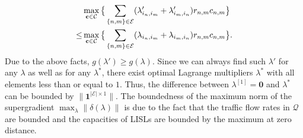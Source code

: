 \documentclass[journal]{IEEEtran}
\begin{document}
\begin{equation}
  \begin{aligned}
&\max_{
  \substack{
    \mathbf{c}\in\mathcal{C}
  }
}
\big\{
\sum_{\{n,m\}\in\mathcal{E}} (\lambda'_{i_n,i_m} + \lambda'_{i_m,i_n})  r_{n,m} c_{n,m}
\big\}\\ 
\leq&
\max_{
  \substack{
    \mathbf{c}\in\mathcal{C}
  }
}
\big\{
\sum_{\{n,m\}\in\mathcal{E}} (\lambda_{i_n,i_m} + \lambda_{i_m,i_n})  r_{n,m} c_{n,m}
\big\}.
  \end{aligned}
  \notag
\end{equation}
Due to the above facts, $g(\lambda')\geq g(\lambda)$. Since we can always find such $\lambda'$ for any $\lambda$ as well as for any $\lambda^*$, there exist optimal Lagrange multipliers $\lambda^*$ with all elements less than or equal to $1$. Thus, the difference between $\lambda^{[1]}=\mathbf{0}$ and $\lambda^*$ can be bounded by $\|\mathbf{1}^{|\mathcal{E}|\times1}\|$. The boundedness of the maximum norm of the supergradient $\max_\lambda \|\delta(\lambda)\|$ is due to the fact that the traffic flow rates in $\mathcal{Q}$ are bounded and the capacities of LISLs are bounded by the maximum at zero distance.
\end{document}
